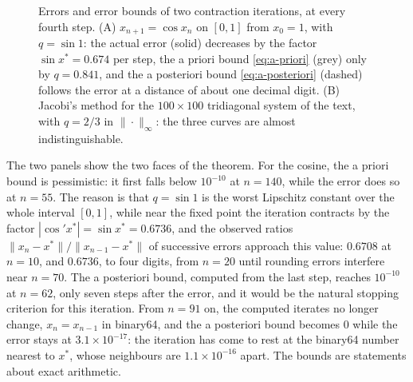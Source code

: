 \begin{figure}
{{}}{Errors and error bounds of two contraction iterations, at every fourth step. (A) $x_{n+1}=\cos x_n$ on $[0,1]$ from $x_0=1$, with $q=\sin1$: the actual error (solid) decreases by the factor $\sin x^*=0.674$ per step, the a priori bound \eqref{eq:a-priori} (grey) only by $q=0.841$, and the a posteriori bound \eqref{eq:a-posteriori} (dashed) follows the error at a distance of about one decimal digit. (B) Jacobi's method for the $100\times100$ tridiagonal system of the text, with $q=2/3$ in $\|\cdot\|_\infty$: the three curves are almost indistinguishable.\label{fig:contraction-bounds}}
\end{figure}

The two panels show the two faces of the theorem. For the cosine, the a priori bound is pessimistic: it first falls below $10^{-10}$ at $n=140$, while the error does so at $n=55$. The reason is that $q=\sin1$ is the worst Lipschitz constant over the whole interval $[0,1]$, while near the fixed point the iteration contracts by the factor $|\cos'x^*|=\sin x^*=0.6736$, and the observed ratios $\|x_n-x^*\|/\|x_{n-1}-x^*\|$ of successive errors approach this value: $0.6708$ at $n=10$, and $0.6736$, to four digits, from $n=20$ until rounding errors interfere near $n=70$. The a posteriori bound, computed from the last step, reaches $10^{-10}$ at $n=62$, only seven steps after the error, and it would be the natural stopping criterion for this iteration. From $n=91$ on, the computed iterates no longer change, $x_n=x_{n-1}$ in binary64, and the a posteriori bound becomes $0$ while the error stays at $3.1\times10^{-17}$: the iteration has come to rest at the binary64 number nearest to $x^*$, whose neighbours are $1.1\times10^{-16}$ apart. The bounds are statements about exact arithmetic.

